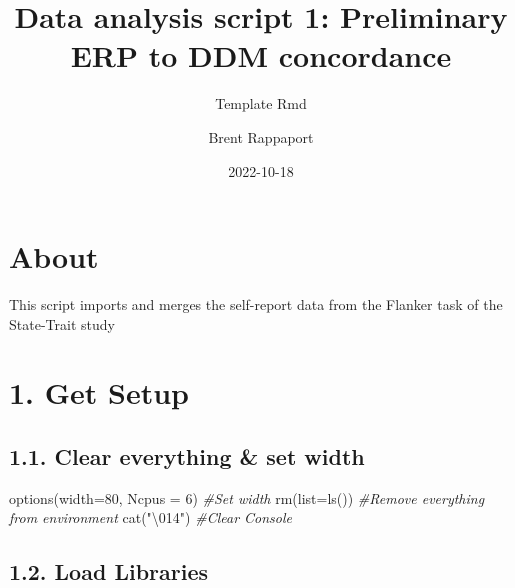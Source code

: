 \documentclass[
]{article}
\title{Data analysis script 1: Preliminary ERP to DDM concordance}
\subtitle{Template Rmd}
\author{Brent Rappaport}
\date{2022-10-18}
\newenvironment{Shaded}{\begin{snugshade}}{\end{snugshade}}
\newcommand{\AttributeTok}[1]{\textcolor[rgb]{0.77,0.63,0.00}{#1}}
\newcommand{\CommentTok}[1]{\textcolor[rgb]{0.56,0.35,0.01}{\textit{#1}}}
\newcommand{\DecValTok}[1]{\textcolor[rgb]{0.00,0.00,0.81}{#1}}
\newcommand{\FunctionTok}[1]{\textcolor[rgb]{0.00,0.00,0.00}{#1}}
\newcommand{\NormalTok}[1]{#1}
\newcommand{\SpecialCharTok}[1]{\textcolor[rgb]{0.00,0.00,0.00}{#1}}
\newcommand{\StringTok}[1]{\textcolor[rgb]{0.31,0.60,0.02}{#1}}
\begin{document}
\maketitle

{
\setcounter{tocdepth}{3}
\tableofcontents
}
\hypertarget{about}{%
\section{About}\label{about}}

This script imports and merges the self-report data from the Flanker
task of the State-Trait study

\hypertarget{get-setup}{%
\section{1. Get Setup}\label{get-setup}}

\hypertarget{clear-everything-set-width}{%
\subsection{1.1. Clear everything \& set
width}\label{clear-everything-set-width}}

\begin{Shaded}
\begin{Highlighting}[]
    \FunctionTok{options}\NormalTok{(}\AttributeTok{width=}\DecValTok{80}\NormalTok{, }\AttributeTok{Ncpus =} \DecValTok{6}\NormalTok{) }\CommentTok{\#Set width}
    \FunctionTok{rm}\NormalTok{(}\AttributeTok{list=}\FunctionTok{ls}\NormalTok{())     }\CommentTok{\#Remove everything from environment}
    \FunctionTok{cat}\NormalTok{(}\StringTok{"}\SpecialCharTok{\textbackslash{}014}\StringTok{"}\NormalTok{)       }\CommentTok{\#Clear Console}
\end{Highlighting}
\end{Shaded}

\hypertarget{load-libraries}{%
\subsection{1.2. Load Libraries}\label{load-libraries}}
\end{document}
